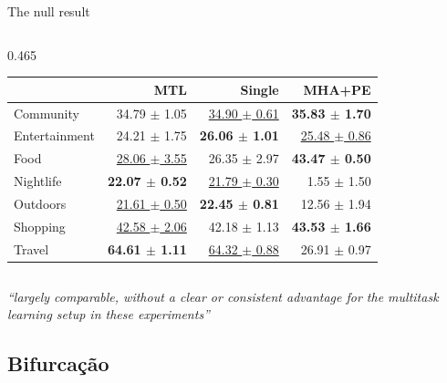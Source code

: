 \documentclass{beamer}
\begin{document}
\begin{frame}{The null result}
\begin{columns}[t,onlytextwidth]
\begin{column}{0.465\textwidth}
{\begin{tabular}{@{}lrrr@{}}
                 & \textbf{MTL} & \textbf{Single} & \textbf{MHA+PE} \\
                \midrule
                Community     & 34.79 $\pm$ 1.05             & \underline{34.90 $\pm$ 0.61} & \textbf{35.83 $\pm$ 1.70} \\
                Entertainment & 24.21 $\pm$ 1.75             & \textbf{26.06 $\pm$ 1.01}    & \underline{25.48 $\pm$ 0.86} \\
                Food          & \underline{28.06 $\pm$ 3.55} & 26.35 $\pm$ 2.97             & \textbf{43.47 $\pm$ 0.50} \\
                Nightlife     & \textbf{22.07 $\pm$ 0.52}    & \underline{21.79 $\pm$ 0.30} & 1.55 $\pm$ 1.50 \\
                Outdoors      & \underline{21.61 $\pm$ 0.50} & \textbf{22.45 $\pm$ 0.81}    & 12.56 $\pm$ 1.94 \\
                Shopping      & \underline{42.58 $\pm$ 2.06} & 42.18 $\pm$ 1.13             & \textbf{43.53 $\pm$ 1.66} \\
                Travel        & \textbf{64.61 $\pm$ 1.11}    & \underline{64.32 $\pm$ 0.88} & 26.91 $\pm$ 0.97 \\
                \bottomrule
            \end{tabular}\par}
        \end{column}
    \end{columns}

    \begin{alertblock}{}
        \centering\scriptsize \textit{``largely comparable, without a clear or consistent advantage for the multitask learning setup in these experiments''}
    \end{alertblock}
\end{frame}

\subsection{Bifurcação}
\end{document}
